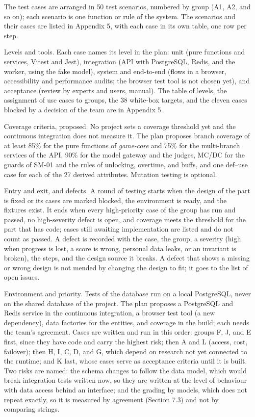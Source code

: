 The test cases are arranged in 50 test scenarios, numbered by group (A1, A2, and so on); each scenario is one function or rule of the system. The scenarios and their cases are listed in Appendix 5, with each case in its own table, one row per step.

Levels and tools. Each case names its level in the plan: unit (pure functions and services, Vitest and Jest), integration (API with PostgreSQL, Redis, and the worker, using the fake model), system and end-to-end (flows in a browser, accessibility and performance audits; the browser test tool is not chosen yet), and acceptance (review by experts and users, manual). The table of levels, the assignment of use cases to groups, the 38 white-box targets, and the eleven cases blocked by a decision of the team are in Appendix 5.

Coverage criteria, proposed. No project sets a coverage threshold yet and the continuous integration does not measure it. The plan proposes branch coverage of at least 85\% for the pure functions of \textit{game-core} and 75\% for the multi-\allowbreak{}branch services of the API, 90\% for the model gateway and the judges, MC/DC for the guards of SM-01 and the rules of unlocking, overtime, and buffs, and one def--use case for each of the 27 derived attributes. Mutation testing is optional.

Entry and exit, and defects. A round of testing starts when the design of the part is fixed or its cases are marked blocked, the environment is ready, and the fixtures exist. It ends when every high-\allowbreak{}priority case of the group has run and passed, no high-\allowbreak{}severity defect is open, and coverage meets the threshold for the part that has code; cases still awaiting implementation are listed and do not count as passed. A defect is recorded with the case, the group, a severity (high when progress is lost, a score is wrong, personal data leaks, or an invariant is broken), the steps, and the design source it breaks. A defect that shows a missing or wrong design is not mended by changing the design to fit; it goes to the list of open issues.

Environment and priority. Tests of the database run on a local PostgreSQL, never on the shared database of the project. The plan proposes a PostgreSQL and Redis service in the continuous integration, a browser test tool (a new dependency), data factories for the entities, and coverage in the build; each needs the team's agreement. Cases are written and run in this order: groups F, J, and E first, since they have code and carry the highest risk; then A and L (access, cost, failover); then H, I, C, D, and G, which depend on research not yet connected to the runtime; and K last, whose cases serve as acceptance criteria until it is built. Two risks are named: the schema changes to follow the data model, which would break integration tests written now, so they are written at the level of behaviour with data access behind an interface; and the grading by models, which does not repeat exactly, so it is measured by agreement (Section 7.3) and not by comparing strings.

